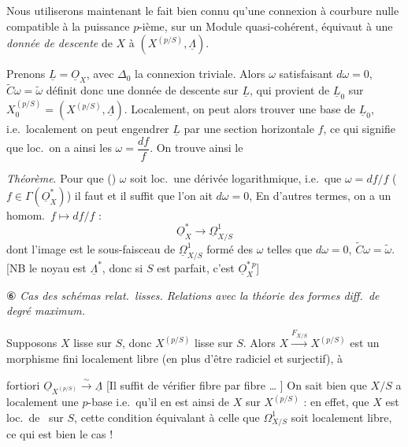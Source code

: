 \documentclass[11pt,a4paper]{article}
\begin{document}
Nous utiliserons maintenant le fait bien connu qu'une connexion à courbure nulle   compatible à la puissance $p$-ième, sur un Module quasi-cohérent, équivaut à une \emph{donnée de descente} de $X$ à $(X^{(p/S)}, \underline{\Lambda})$. 

 Prenons $\underline{L} = \underline{O}_{X}$, avec $\Delta_{0}$ la connexion triviale. Alors $\omega$ satisfaisant $d\omega = 0$, $\widetilde{C}\omega = \widetilde{\omega}$ définit donc une donnée de descente sur $\underline{L}$, qui \struck{\ill{}} provient de $\underline{L}_{0}$ sur $X^{(p/S)}_{0} = (X^{(p/S)}, \underline{\Lambda})$. Localement, on peut alors \struck{\ill{}} trouver une base de $\underline{L}_{0}$, \struck{\ill{}} i.e.\ localement on peut engendrer $\underline{L}$ par une section horizontale $f$, ce qui signifie que loc.\ on a ainsi les $\omega = \dfrac{df}{f}$. On trouve ainsi le

\emph{Théorème}. Pour que () $\omega$ soit loc.\ une dérivée logarithmique, i.e.\ que $\omega = df/f$ ($f \in \Gamma(\underline{O}_{X}^{*})$) il faut et il suffit que l'on ait $d\omega = 0$,  En d'autres termes, on a un homom.\ $f \mapsto df/f$ :
\[
\underline{O}_{X}^{*} \longrightarrow \underline{\Omega}^{1}_{X/S}
\]
dont l'image est le sous-faisceau de $\underline{\Omega}^{1}_{X/S}$ formé des $\omega$ telles que $d\omega = 0$, $\widetilde{C}\omega = \widetilde{\omega}$. [NB le noyau est $\underline{\Lambda}^{*}$, donc si $S$ est parfait, c'est $\underline{O}_{X}^{*\,p}$]

⑥ \emph{Cas des schémas relat.\ lisses. Relations avec la théorie des formes diff.\ de degré maximum.}

Supposons $X$ lisse sur $S$, donc $X^{(p/S)}$ lisse sur $S$. Alors $X \xrightarrow{F_{X/S}} X^{(p/S)}$ est un morphisme fini localement libre (en plus d'être radiciel et surjectif), à

fortiori $\underline{O}_{X^{(p/S)}} \xrightarrow{\sim} \underline{\Lambda}$  [Il suffit  de vérifier fibre par fibre … ] On sait bien que $X/S$ a localement une $p$-base i.e.\ qu'il en est ainsi de $X$ sur $X^{(p/S)}$ : en effet,     que $X$ est loc.\ de \ sur $S$, cette condition équivalant à celle que $\Omega^{1}_{X/S}$ soit localement libre, ce qui est bien le cas !
\end{document}

